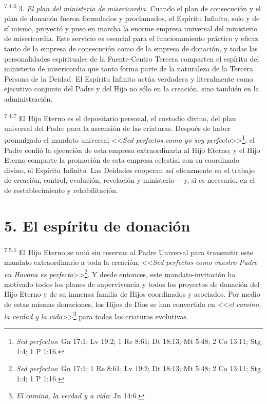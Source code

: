 \par
\textsuperscript{7:4.6} 3. \textit{El plan del ministerio de misericordia.} Cuando el plan de consecución y el plan de donación fueron formulados y proclamados, el Espíritu Infinito, solo y de sí mismo, proyectó y puso en marcha la enorme empresa universal del ministerio de misericordia. Este servicio es esencial para el funcionamiento práctico y eficaz tanto de la empresa de consecución como de la empresa de donación, y todas las personalidades espirituales de la Fuente-Centro Tercera comparten el espíritu del ministerio de misericordia que tanto forma parte de la naturaleza de la Tercera Persona de la Deidad. El Espíritu Infinito actúa verdadera y literalmente como ejecutivo conjunto del Padre y del Hijo no sólo en la creación, sino también en la administración.

\par
\textsuperscript{7:4.7} El Hijo Eterno es el depositario personal, el custodio divino, del plan universal del Padre para la ascensión de las criaturas. Después de haber promulgado el mandato universal <<\textit{Sed perfectos como yo soy perfecto}>>\footnote{\textit{Sed perfectos}: Gn 17:1; Lv 19:2; 1 Re 8:61; Dt 18:13; Mt 5:48; 2 Co 13:11; Stg 1:4; 1 P 1:16.}, el Padre confió la ejecución de esta empresa extraordinaria al Hijo Eterno; y el Hijo Eterno comparte la promoción de esta empresa celestial con su coordinado divino, el Espíritu Infinito. Las Deidades cooperan así eficazmente en el trabajo de creación, control, evolución, revelación y ministerio ---y, si es necesario, en el de restablecimiento y rehabilitación.

\section*{5. El espíritu de donación}
\par
\textsuperscript{7:5.1} El Hijo Eterno se unió sin reservas al Padre Universal para transmitir este mandato extraordinario a toda la creación: <<\textit{Sed perfectos como vuestro Padre en Havona es perfecto}>>\footnote{\textit{Sed perfectos}: Gn 17:1; 1 Re 8:61; Lv 19:2; Dt 18:13; Mt 5:48; 2 Co 13:11; Stg 1:4; 1 P 1:16.}. Y desde entonces, este mandato-invitación ha motivado todos los planes de supervivencia y todos los proyectos de donación del Hijo Eterno y de su inmensa familia de Hijos coordinados y asociados. Por medio de estas mismas donaciones, los Hijos de Dios se han convertido en <<\textit{el camino, la verdad y la vida}>>\footnote{\textit{El camino, la verdad y a vida}: Jn 14:6.} para todas las criaturas evolutivas.

